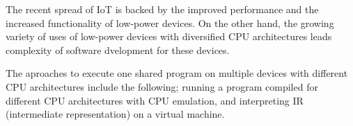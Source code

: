 \begin{eabstract}

The recent spread of IoT is backed by the improved performance and the increased functionality of low-power devices.
On the other hand, the growing variety of uses of low-power devices with diversified CPU architectures leads complexity of software dvelopment for these devices.

The aproaches to execute one shared program on multiple devices with different CPU architectures include the following;
running a program compiled for different CPU architectures with CPU emulation,
and interpreting IR (intermediate representation) on a virtual machine.

\end{eabstract}
